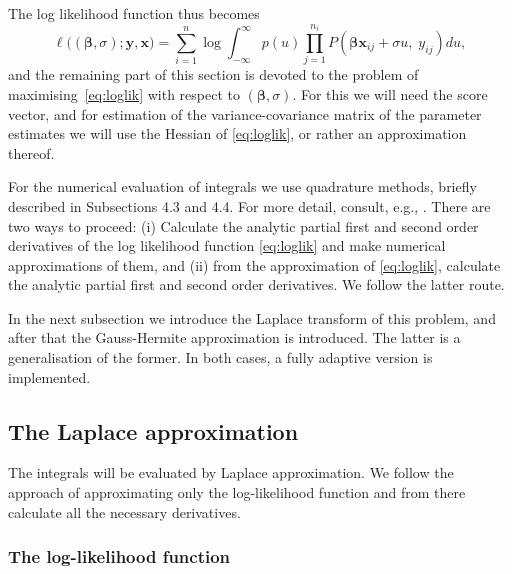 \documentclass[a4paper,11pt]{article}
\newcommand{\bx}{\ensuremath{\mathbf{x}}}
\newcommand{\by}{\ensuremath{\mathbf{y}}}
\newcommand{\bb}{\ensuremath{\boldsymbol{\beta}}}
\newcommand{\Py}{\ensuremath{P(\bb\bx_{ij} + \sigma u, \; y_{ij})}}
\begin{document}
The log likelihood function thus becomes
\begin{equation}\label{eq:loglik}
\ell\big((\bb, \sigma); \by, \bx\big) 
= \sum_{i = 1}^n \log 
\int_{-\infty}^{\infty} 
p(u) \prod_{j = 1}^{n_i} \Py  du,
\end{equation}
and the remaining part of this section is devoted to the problem of
maximising~\eqref{eq:loglik} with respect to $(\bb, \sigma)$. For this we will need the
score vector, 
and for estimation of the
variance-covariance matrix of the parameter estimates we will use the
Hessian of \eqref{eq:loglik}, or rather an approximation thereof.

For the numerical evaluation of integrals we use quadrature methods,
briefly described in Subsections 4.3 and 4.4. For more detail, consult,
e.g., \citet{gray02}. There are two ways to proceed: (i) Calculate the
analytic partial first and second order derivatives of the log likelihood
function \eqref{eq:loglik} and make numerical approximations of them, and
(ii) from the approximation of \eqref{eq:loglik}, calculate the analytic
partial first and second order derivatives. We follow the latter route. 

In the next subsection we introduce the Laplace transform of this problem,
and after that the Gauss-Hermite approximation is introduced. The latter is a
generalisation of the former. In both cases, a fully adaptive version is
implemented.  

\subsection{The Laplace approximation}

The integrals will be evaluated by Laplace approximation. We follow the
approach of approximating only the log-likelihood function and from there
calculate all the necessary derivatives.

\subsubsection{The log-likelihood function}
\end{document}

